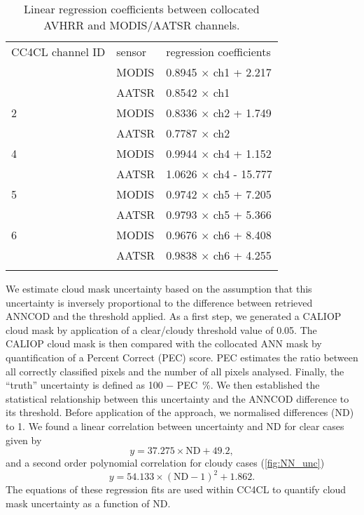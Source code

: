 \begin{table}[h]
  \caption{Linear regression coefficients between collocated AVHRR and MODIS/AATSR channels.}
  \begin{tabular}{l|l|l} %
    \tophline
    CC4CL channel ID & sensor & regression coefficients \\
    \middlehline
    1 & MODIS & 0.8945 $\times$ ch1 + 2.217 \\
    & AATSR & 0.8542 $\times$ ch1 \\ \hline
    2 & MODIS & 0.8336 $\times$ ch2 + 1.749 \\
    & AATSR & 0.7787 $\times$ ch2 \\ \hline
    4 & MODIS & 0.9944 $\times$ ch4 + 1.152 \\
    & AATSR & 1.0626 $\times$ ch4 - 15.777 \\ \hline
    5 & MODIS & 0.9742 $\times$ ch5 + 7.205 \\
    & AATSR & 0.9793 $\times$ ch5 + 5.366 \\ \hline
    6 & MODIS & 0.9676 $\times$ ch6 + 8.408 \\
    & AATSR & 0.9838 $\times$ ch6 + 4.255 \\
    \bottomhline
  \end{tabular}
  \label{tab:ANN_coefficients}
\end{table}

We estimate cloud mask uncertainty based on the assumption that this uncertainty is inversely proportional to the difference between retrieved ANNCOD and the threshold applied. As a first step, we generated a CALIOP cloud mask by application of a clear/cloudy threshold value of 0.05. The CALIOP cloud mask is then compared with the collocated ANN mask by quantification of a Percent Correct (PEC) score. PEC estimates the ratio between all correctly classified pixels and the number of all pixels analysed. Finally, the ``truth'' uncertainty is defined as 100 $-$ PEC~\%. We then established the statistical relationship between this uncertainty and the ANNCOD difference to its threshold. Before application of the approach, we normalised differences (ND) to 1. We found a linear correlation between uncertainty and ND for clear cases given by 
\begin{equation}
  y = 37.275 \times \mathrm{ND} + 49.2,
\end{equation}
and a second order polynomial correlation for cloudy cases (\autoref{fig:NN_unc})
\begin{equation}
  y = 54.133 \times (\mathrm{ND}-1)^2 + 1.862.
\end{equation}
The equations of these regression fits are used within CC4CL to quantify cloud mask uncertainty as a function of ND.

